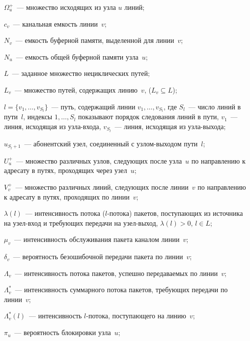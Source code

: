 \begin{multicols}{2}
     $\Omega_u^+$~--- множество исходящих из узла $u$ линий;
     
     $c_v$~--- канальная емкость линии~$v$;
     
     $N_v$~--- емкость буферной памяти, выделенной для линии~$v$;
     
     $N_u$~--- емкость общей буферной памяти узла~$u$;
     
     $L$~--- заданное множество нециклических путей;
     
     $L_v$~--- множество путей, содержащих линию~$v$, ($L_v\subseteq L$);
     
     $l=\{v_1,\ldots ,v_{S_l}\}$~--- путь, содержащий линии $v_1,\ldots 
,v_{S_l}$, где $S_l$~--- число линий в пути~$l$, индексы $1,\ldots ,S_l$ 
показывают порядок следования линий в пути, $v_1$~--- линия, исходящая из 
     узла-входа, $v_{S_l}$~--- линия, исходящая из узла-выхода;
\pagebreak
     
     $u_{S_l+1}$~--- абонентский узел, соединенный с узлом-выходом 
пути~$l$;
     
     $U_u^+$~--- множество различных узлов, следующих после узла~$u$ по 
направлению к адресату в путях, проходящих через узел~$u$;
     
     $V_v^+$~--- множество различных линий, следующих после линии~$v$ 
по направлению к адресату в путях, проходящих по линии~$v$;
     
     $\lambda(l)$~--- интенсивность потока ($l$-потока) пакетов, поступающих 
из источника на узел-вход и требу\-ющих передачи на узел-выход, $\lambda(l) 
>0$, $l\in L$;
     
     $\mu_v$~--- интенсивность обслуживания пакета каналом линии~$v$;
     
     $\delta_v$~--- вероятность безошибочной передачи пакета по линии~$v$;
     
     $\Lambda_v$~--- интенсивность потока пакетов, успешно передаваемых 
по линии~$v$;
     
     $\Lambda_v^*$~--- интенсивность суммарного потока пакетов, 
требующих передачи по линии~$v$;
     
     $\Lambda_v^*(l)$~--- интенсивность $l$-потока, поступающего на 
линию~$v$;
     
     $\pi_u$~--- вероятность блокировки узла~$u$;
     

\end{multicols}
